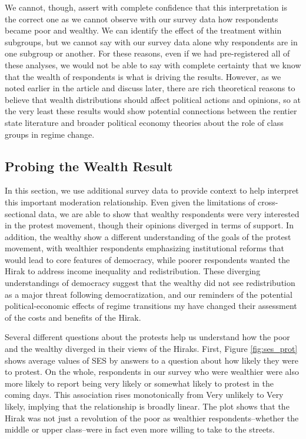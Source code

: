 \documentclass[12pt, letterpaper]{article}
\begin{document}
We cannot, though, assert with complete confidence that this interpretation is the correct one as we cannot observe with our survey data how respondents became poor and wealthy. We can identify the effect of the treatment within subgroups, but we cannot say with our survey data alone why respondents are in one subgroup or another. For these reasons, even if we had pre-registered all of these analyses, we would not be able to say with complete certainty that we know that the wealth of respondents is what is driving the results. However, as we noted earlier in the article and discuss later, there are rich theoretical reasons to believe that wealth distributions should affect political actions and opinions, so at the very least these results would show potential connections between the rentier state literature and broader political economy theories about the role of class groups in regime change.

\subsection*{Probing the Wealth Result}

In this section, we use additional survey data to provide context to help interpret this important moderation relationship. Even given the limitations of cross-sectional data, we are able to show that wealthy respondents were very interested in the protest movement, though their opinions diverged in terms of support. In addition, the wealthy show a different understanding of the goals of the protest movement, with wealthier respondents emphasizing institutional reforms that would lead to core features of democracy, while poorer respondents wanted the Hirak to address income inequality and redistribution. These diverging understandings of democracy suggest that the wealthy did not see redistribution as a major threat following democratization, and our reminders of the potential political-economic effects of regime transitions my have changed their assessment of the costs and benefits of the Hirak.

Several different questions about the protests help us understand how the poor and the wealthy diverged in their views of the Hiraks. First, Figure \ref{fig:ses_prot} shows average values of SES by answers to a question about how likely they were to protest. On the whole, respondents in our survey who were wealthier were also more likely to report being very likely or somewhat likely to protest in the coming days. This association rises monotonically from Very unlikely to Very likely, implying that the relationship is broadly linear. The plot shows that the Hirak was not just a revolution of the poor as wealthier respondents--whether the middle or upper class--were in fact even more willing to take to the streets.
\end{document}
